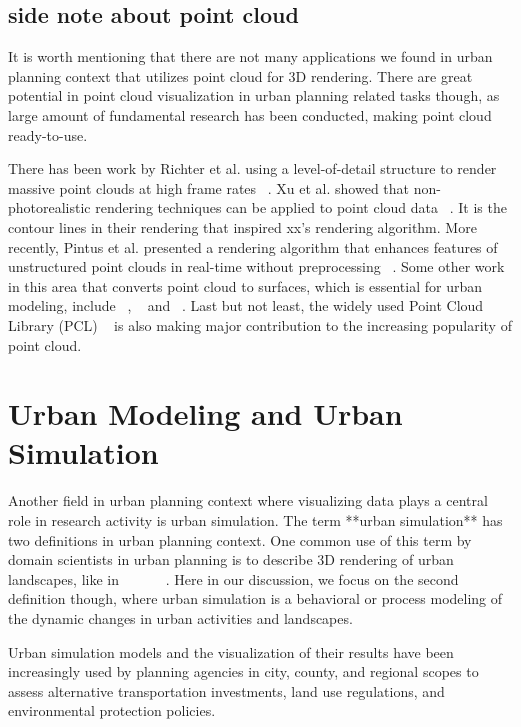 \documentclass{egpubl}
\begin{document}
\subsection{side note about point cloud}
It is worth mentioning that there are not many applications we found in urban planning context that utilizes point cloud for 3D rendering. There are great potential in point cloud visualization in urban planning related tasks though, as large amount of fundamental research has been conducted, making point cloud ready-to-use.

There has been work by Richter et al. using a level-of-detail structure to render massive point clouds at high frame rates ~\cite{richter2010out}. Xu et al. showed that non-photorealistic rendering techniques can be applied to point cloud data ~\cite{xu2004stylized}. It is the contour lines in their rendering that inspired xx's rendering algorithm.
More recently, Pintus et al. presented a rendering algorithm that enhances features of unstructured point clouds in real-time without preprocessing ~\cite{Pintus:2011:RRM:2384495.2384513}. Some other work in this area that converts point cloud to surfaces, which is essential for urban modeling, include ~\cite{fabio2003point}, ~\cite{holzer2012adaptive} and ~\cite{nagai2015tomographic}. Last but not least, the widely used Point Cloud Library (PCL) ~\cite{rusu20113d} is also making major contribution to the increasing popularity of point cloud.

\section{Urban Modeling and Urban Simulation}
Another field in urban planning context where visualizing data plays a central role in research activity is urban simulation. The term **urban simulation** has two definitions in urban planning context. One common use of this term by domain scientists in urban planning is to describe 3D rendering of urban landscapes, like in ~\cite{fruh2003constructing}~\cite{merrell2007example}~\cite{muller2006procedural}~\cite{muller2007image}~\cite{parish2001procedural}~\cite{ribarsky2002urban}. Here in our discussion, we focus on the second definition though, where urban simulation is a behavioral or process modeling of the dynamic changes in urban activities and landscapes.

Urban simulation models and the visualization of their results have been increasingly used by planning agencies in city, county, and regional scopes to assess alternative transportation investments, land use regulations, and environmental protection policies.
\end{document}
